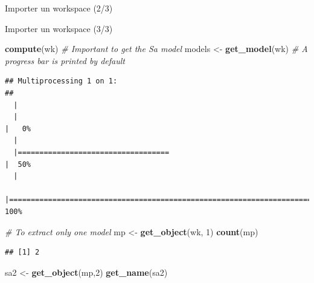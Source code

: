 \documentclass[10pt,xcolor=table,color={dvipsnames,usenames},ignorenonframetext,usepdftitle=false,french]{beamer}
\newenvironment{Shaded}{\begin{snugshade}}{\end{snugshade}}
\newcommand{\CommentTok}[1]{\textcolor[rgb]{0.56,0.35,0.01}{\textit{#1}}}
\newcommand{\DecValTok}[1]{\textcolor[rgb]{0.00,0.00,0.81}{#1}}
\newcommand{\KeywordTok}[1]{\textcolor[rgb]{0.13,0.29,0.53}{\textbf{#1}}}
\newcommand{\NormalTok}[1]{#1}
\newcommand{\StringTok}[1]{\textcolor[rgb]{0.31,0.60,0.02}{#1}}
\begin{document}
\begin{frame}{Importer un workspace (2/3)}
\protect\hypertarget{importer-un-workspace-23}{}


\end{frame}

\begin{frame}[fragile]{Importer un workspace (3/3)}
\protect\hypertarget{importer-un-workspace-33}{}

\footnotesize

\begin{Shaded}
\begin{Highlighting}[]
\KeywordTok{compute}\NormalTok{(wk) }\CommentTok{# Important to get the Sa model}
\NormalTok{models <-}\StringTok{ }\KeywordTok{get_model}\NormalTok{(wk) }\CommentTok{# A progress bar is printed by default}
\end{Highlighting}
\end{Shaded}

\begin{verbatim}
## Multiprocessing 1 on 1:
## 
  |                                                                            
  |                                                                      |   0%
  |                                                                            
  |===================================                                   |  50%
  |                                                                            
  |======================================================================| 100%
\end{verbatim}

\begin{Shaded}
\begin{Highlighting}[]
\CommentTok{# To extract only one model}
\NormalTok{mp <-}\StringTok{ }\KeywordTok{get_object}\NormalTok{(wk, }\DecValTok{1}\NormalTok{)}
\KeywordTok{count}\NormalTok{(mp)}
\end{Highlighting}
\end{Shaded}

\begin{verbatim}
## [1] 2
\end{verbatim}

\begin{Shaded}
\begin{Highlighting}[]
\NormalTok{sa2 <-}\StringTok{ }\KeywordTok{get_object}\NormalTok{(mp,}\DecValTok{2}\NormalTok{)}
\KeywordTok{get_name}\NormalTok{(sa2)}
\end{Highlighting}
\end{Shaded}


\end{frame}
\end{document}
